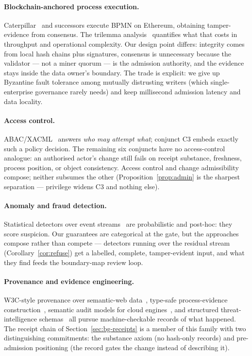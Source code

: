 \paragraph{Blockchain-anchored process execution.}
Caterpillar~\cite{lopez_pineda_blockchain_2019} and successors execute BPMN on
Ethereum, obtaining tamper-evidence from consensus. The trilemma
analysis~\cite{blockchain_trilemma_2024} quantifies what that costs in
throughput and operational complexity. Our design point differs: integrity
comes from local hash chains plus signatures, consensus is unnecessary because
the validator --- not a miner quorum --- is the admission authority, and the
evidence stays inside the data owner's boundary. The trade is explicit: we
give up Byzantine fault tolerance among mutually distrusting writers (which
single-enterprise governance rarely needs) and keep millisecond admission
latency and data locality.

\paragraph{Access control.}
ABAC/XACML~\cite{xacml_standard_2013} answers \emph{who may attempt what};
conjunct C3 embeds exactly such a policy decision. The remaining six conjuncts
have no access-control analogue: an authorised actor's change still fails on
receipt substance, freshness, process position, or object consistency. Access
control and change admissibility compose; neither subsumes the other
(Proposition~\ref{prop:admin} is the sharpest separation --- privilege widens
C3 and nothing else).

\paragraph{Anomaly and fraud detection.}
Statistical detectors over event
streams~\cite{ko_comuzzi_anomaly_2021,bose_et_al_concept_drift_pm_2014} are
probabilistic and post-hoc: they score suspicion. Our guarantees are
categorical at the gate, but the approaches compose rather than compete ---
detectors running over the residual stream (Corollary~\ref{cor:refuse}) get a
labelled, complete, tamper-evident input, and what they find feeds the
boundary-map review loop.

\paragraph{Provenance and evidence engineering.}
W3C-style provenance over semantic-web
data~\cite{provenance_semantic_web_2025}, type-safe process-evidence
construction~\cite{type_safe_process_evidence_2024}, semantic audit models for
cloud engines~\cite{sargolzaei_audit_cloud_2022}, and structured
threat-intelligence schemas~\cite{stix_v21_2022} all pursue machine-checkable
records of what happened. The receipt chain of
Section~\ref{sec:bg-receipts} is a member of this family with two
distinguishing commitments: the substance axiom (no hash-only records) and
pre-admission positioning (the record gates the change instead of describing
it).


